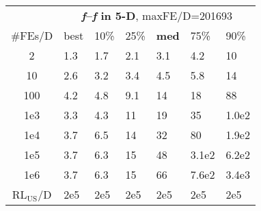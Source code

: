 \begin{tabular}{c|llllll}
 & \multicolumn{6}{|c}{\textbf{\textit{f}\raisebox{-0.35ex}{1}--\textit{f}\raisebox{-0.35ex}{24} in 5-D}, maxFE/D=201693}\\
\#FEs/D & best & 10\% & 25\% & \textbf{med} & 75\% & 90\%\\
2 & \hspace*{1ex}1.3 & \hspace*{1ex}1.7 & \hspace*{1ex}2.1 & \hspace*{1ex}3.1 & \hspace*{1ex}4.2 & 10\\
10 & \hspace*{1ex}2.6 & \hspace*{1ex}3.2 & \hspace*{1ex}3.4 & \hspace*{1ex}4.5 & \hspace*{1ex}5.8 & 14\\
100 & \hspace*{1ex}4.2 & \hspace*{1ex}4.8 & \hspace*{1ex}9.1 & 14 & 18 & 88\\
1e3 & \hspace*{1ex}3.3 & \hspace*{1ex}4.3 & 11 & 19 & 35 & 1.0e2\\
1e4 & \hspace*{1ex}3.7 & \hspace*{1ex}6.5 & 14 & 32 & 80 & 1.9e2\\
1e5 & \hspace*{1ex}3.7 & \hspace*{1ex}6.3 & 15 & 48 & 3.1e2 & 6.2e2\\
1e6 & \hspace*{1ex}3.7 & \hspace*{1ex}6.3 & 15 & 66 & 7.6e2 & 3.4e3\\
$\text{RL}_{\text{US}}$/D & 2e5 & 2e5 & 2e5 & 2e5 & 2e5 & 2e5
\end{tabular}
